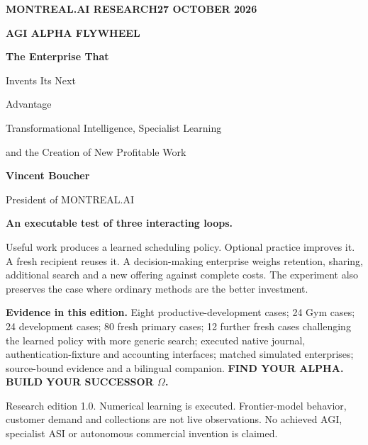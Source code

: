 \documentclass[11pt,letterpaper]{article}
\begin{document}
\hypersetup{pageanchor=false}
\begin{titlepage}
\vspace*{0.3in}
{\small\bfseries\color{teal}MONTREAL.AI RESEARCH\hfill 27 OCTOBER 2026}\par
\vspace{0.45in}
{\Large\bfseries AGI ALPHA FLYWHEEL}\par
\vspace{0.18in}
{\fontsize{31}{35}\selectfont\bfseries\color{ink}The Enterprise That\par Invents Its Next\par Advantage}\par
\vspace{0.22in}
{\large Transformational Intelligence, Specialist Learning\par and the Creation of New Profitable Work}\par
\vspace{0.3in}
{\large\bfseries Vincent Boucher}\par
{\normalsize President of MONTREAL.AI}\par
\vspace{0.28in}
\begin{findingbox}
\textbf{An executable test of three interacting loops.}\par
Useful work produces a learned scheduling policy. Optional practice improves it. A fresh recipient reuses it. A decision-making enterprise weighs retention, sharing, additional search and a new offering against complete costs. The experiment also preserves the case where ordinary methods are the better investment.
\end{findingbox}
\vspace{0.1in}
\textbf{Evidence in this edition.} Eight productive-development cases; 24 Gym cases; 24 development cases; 80 fresh primary cases; 12 further fresh cases challenging the learned policy with more generic search; executed native journal, authentication-fixture and accounting interfaces; matched simulated enterprises; source-bound evidence and a bilingual companion.
\vfill
{\bfseries\color{teal}FIND YOUR ALPHA. BUILD YOUR SUCCESSOR $\Omega$.}\par
\vspace{0.12in}
{\small Research edition 1.0. Numerical learning is executed. Frontier-model behavior, customer demand and collections are not live observations. No achieved AGI, specialist ASI or autonomous commercial invention is claimed.}
\end{titlepage}
\hypersetup{pageanchor=true}
\end{document}
